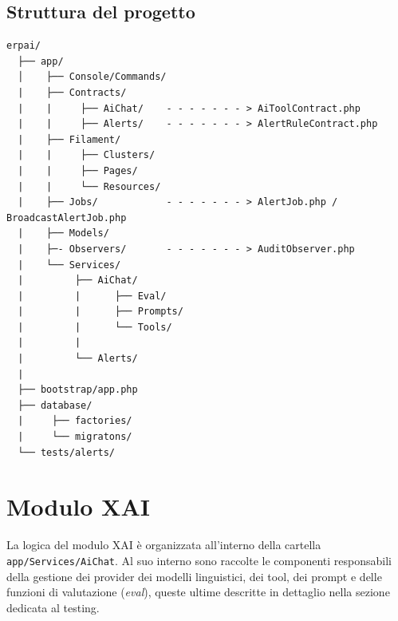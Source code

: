 \newpage
\subsection{Struttura del progetto}
\begin{listing}[H]
\begin{verbatim}
erpai/
  ├── app/
  │    ├── Console/Commands/
  |    ├── Contracts/
  |    |     ├── AiChat/    - - - - - - - > AiToolContract.php       
  |    |     ├── Alerts/    - - - - - - - > AlertRuleContract.php 
  |    ├── Filament/
  |    |     ├── Clusters/
  |    |     ├── Pages/
  |    |     └── Resources/
  |    ├── Jobs/            - - - - - - - > AlertJob.php / BroadcastAlertJob.php
  |    ├── Models/ 
  |    ├─- Observers/       - - - - - - - > AuditObserver.php
  |    └── Services/
  |         ├── AiChat/
  |         |      ├── Eval/
  |         |      ├── Prompts/
  |         |      └── Tools/
  |         |      
  |         └── Alerts/
  |
  ├── bootstrap/app.php
  ├── database/
  |     ├── factories/
  |     └── migratons/
  └── tests/alerts/
\end{verbatim}
\caption{Struttura del progetto}
\label{listing:folders}
\end{listing}

\section{Modulo XAI}
La logica del modulo XAI è organizzata all'interno della cartella \newline\texttt{app/Services/AiChat}. Al suo interno sono raccolte le componenti responsabili della gestione 
dei provider dei modelli linguistici, dei tool, dei prompt e delle funzioni di valutazione (\textit{eval}), queste ultime descritte in dettaglio nella sezione dedicata al 
testing.

